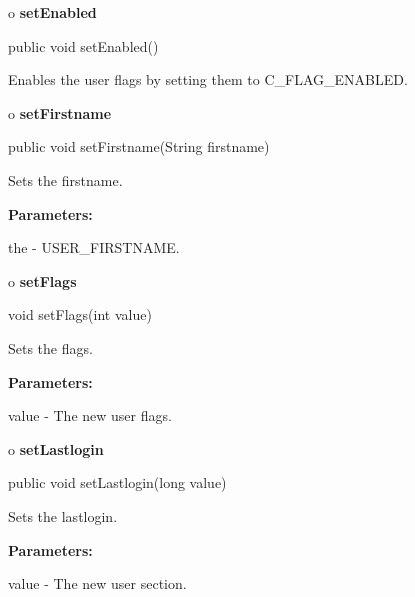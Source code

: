 o {\bf setEnabled} 

\begin{PRE}
 public void setEnabled()
\end{PRE}

\begin{description}
\htmlDD Enables the user flags by setting them to C\_FLAG\_ENABLED. 

\end{description}

o {\bf setFirstname} 

\begin{PRE}
 public void setFirstname(String firstname)
\end{PRE}

\begin{description}
\htmlDD Sets the firstname. 

\begin{description}
\item {\bf Parameters:}  

the - USER\_FIRSTNAME.  
\end{description}

\end{description}

o {\bf setFlags} 

\begin{PRE}
 void setFlags(int value)
\end{PRE}

\begin{description}
\htmlDD Sets the flags. 

\begin{description}
\item {\bf Parameters:}  

value - The new user flags.  
\end{description}

\end{description}

o {\bf setLastlogin} 

\begin{PRE}
 public void setLastlogin(long value)
\end{PRE}

\begin{description}
\htmlDD Sets the lastlogin. 

\begin{description}
\item {\bf Parameters:}  

value - The new user section.  
\end{description}

\end{description}

